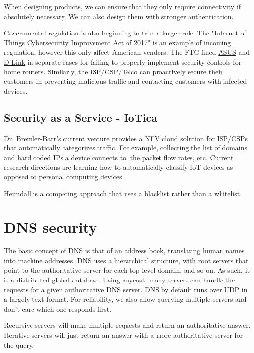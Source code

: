 \documentclass{idc_msc}
\begin{document}
When designing products, we can ensure that they only require connectivity if absolutely necessary.
We can also design them with stronger authentication.

Governmental regulation is also beginning to take a larger role.
The \href{https://www.congress.gov/bill/115th-congress/senate-bill/1691/all-info?r=52}{"Internet of Things Cybersecurity Improvement Act of 2017"} is an example of incoming regulation, however this only affect American vendors.
The FTC fined \href{https://www.ftc.gov/news-events/press-releases/2016/02/asus-settles-ftc-charges-insecure-home-routers-cloud-services-put}{ASUS} and \href{https://www.ftc.gov/news-events/press-releases/2017/01/ftc-charges-d-link-put-consumers-privacy-risk-due-inadequate}{D-Link} in separate cases for failing to properly implement security controls for home routers.
Similarly, the ISP/CSP/Telco can proactively secure their customers in preventing malicious traffic and contacting customers with infected devices.

\subsection{Security as a Service - IoTica}

Dr. Bremler-Barr's current venture provides a NFV cloud solution for ISP/CSPs that automatically categorizes traffic.
For example, collecting the list of domains and hard coded IPs a device connects to, the packet flow rates, etc.
Current research directions are learning how to automatically classify IoT devices as opposed to personal computing devices.

Heimdall is a competing approach that uses a blacklist rather than a whitelist.

\section{DNS security}

The basic concept of DNS is that of an address book, translating human names into machine addresses.
DNS uses a hierarchical structure, with root servers that point to the authoritative server for each top level domain, and so on.
As such, it is a distributed global database.
Using anycast, many servers can handle the requests for a given authoritative DNS server.
DNS by default runs over UDP in a largely text format.
For reliability, we also allow querying multiple servers and don't care which one responds first.

Recursive servers will make multiple requests and return an authoritative answer.
Iterative servers will just return an answer with a more authoritative server for the query.
\end{document}
